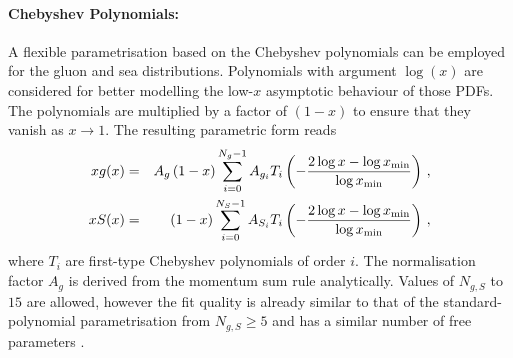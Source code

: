 \paragraph{Chebyshev Polynomials:} 
A flexible parametrisation  based on the Chebyshev polynomials can be employed for the gluon and sea distributions.
Polynomials with argument $\log(x)$ are considered for better modelling the low-$x$ asymptotic behaviour of those PDFs. 
The polynomials are multiplied
by a factor of $(1-x)$ to ensure that they vanish as $x\to 1$. The resulting parametric form reads
\begin{eqnarray}
x g(x) &=& A_g \left(1-x\right) \sum_{i=0}^{N_g-1} A_{g_i} T_i \left(-\frac{\textstyle 2\log x - \log x_{\rm min} } {\textstyle \log x_{\rm min} } \right)\,, \label{eq:glu} \\
x S(x) &=& \left(1-x\right) \sum_{i=0}^{N_S-1} A_{S_i} T_i \left(-\frac{\textstyle 2\log x - \log x_{\rm min} } {\textstyle \log x_{\rm min} } \right)\,, \label{eq:sea} 
\end{eqnarray}
where $T_i$ are first-type Chebyshev polynomials of order $i$.
The normalisation factor $A_g$ is derived from the momentum sum rule analytically.
Values of $N_{g,S}$ to $15$ are allowed, however the fit quality is already similar
to that of the standard-polynomial parametrisation from $N_{g,S} \ge 5$  and has a similar number of free parameters \cite{Chebyshev}.
%
%

